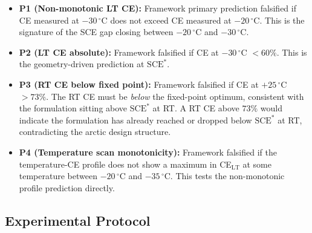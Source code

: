 \documentclass[11pt]{article}
\theoremstyle{plain}
\theoremstyle{definition}
\theoremstyle{remark}
\begin{document}
\begin{itemize}[leftmargin=2em]
  \item \textbf{P1 (Non-monotonic LT CE):} Framework primary
        prediction falsified if CE measured at $-30\,^\circ$C does
        not exceed CE measured at $-20\,^\circ$C.  This is the
        signature of the SCE gap closing between $-20\,^\circ$C
        and $-30\,^\circ$C.
  \item \textbf{P2 (LT CE absolute):} Framework falsified if
        CE at $-30\,^\circ$C $< 60\%$.  This is the geometry-driven
        prediction at $\mathrm{SCE}^{*}$.
  \item \textbf{P3 (RT CE below fixed point):} Framework falsified
        if CE at $+25\,^\circ$C $> 73\%$.  The RT CE must be
        \emph{below} the fixed-point optimum, consistent with the
        formulation sitting above $\mathrm{SCE}^{*}$ at RT.
        A RT CE above $73\%$ would indicate the formulation has
        already reached or dropped below $\mathrm{SCE}^{*}$
        at RT, contradicting the arctic design structure.
  \item \textbf{P4 (Temperature scan monotonicity):} Framework
        falsified if the temperature-CE profile does not show a
        maximum in CE$_\mathrm{LT}$ at some temperature between
        $-20\,^\circ$C and $-35\,^\circ$C.  This tests the
        non-monotonic profile prediction directly.
\end{itemize}

\subsection{Experimental Protocol}
\end{document}
